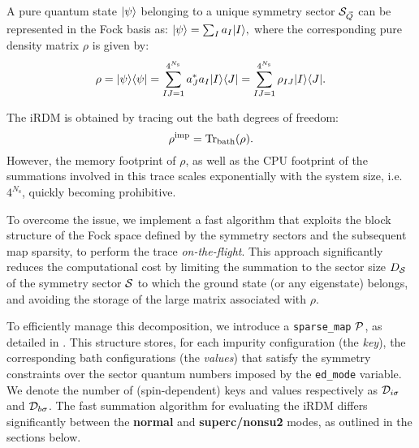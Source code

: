 \documentclass[edipack2.tex]{subfiles}
\begin{document}
A pure quantum state $|\psi\rangle$ belonging to a unique symmetry 
sector ${\cal S}_{\vec{Q}}$ can be represented in the Fock basis as:
$
|\psi\rangle = \sum_I a_I |I\rangle,
$
where the corresponding pure density matrix $\rho$ is given by:
\begin{equation}
\rho = |\psi\rangle\langle \psi| = \sum_{IJ=1}^{4^{N_\mathrm{s}}} 
a^*_J a_I |I\rangle\langle J| = \sum_{IJ=1}^{4^{N_\mathrm{s}}} 
\rho_{IJ} |I\rangle\langle J|.
\end{equation}


The iRDM is obtained by tracing out the bath degrees of freedom:
\begin{equation}
\rho^\mathrm{imp} = {\rm Tr}_\mathrm{bath}(\rho).
\end{equation}
However, the memory footprint of $\rho$, as well as the CPU footprint 
of the summations involved in this trace scales exponentially 
with the system size, i.e.~$4^{N_\mathrm{s}}$, quickly becoming prohibitive.

To overcome the issue, we implement a fast algorithm that exploits the 
block structure of the Fock space defined by the symmetry sectors and
the subsequent map sparsity, to perform the trace \emph{on-the-flight}. 
This approach significantly reduces the computational cost by limiting 
the summation to the sector size $D_{\cal S}$ of the symmetry sector 
${\cal S}$ to which the ground state (or any eigenstate) belongs, and avoiding
the storage of the large matrix associated with $\rho$.

%
%
To efficiently manage this decomposition, we introduce a 
{\tt sparse\_map} ${\cal P}$, as detailed in . 
This structure stores, for each impurity configuration 
(the \emph{key}), the 
corresponding bath configurations 
(the \emph{values}) that 
satisfy the symmetry constraints over the sector quantum numbers
imposed by the {\tt ed\_mode} variable.
We denote the number of (spin-dependent) keys and values respectively
as ${\cal D}_{i\sigma}$ and ${\cal D}_{b\sigma}$.
The fast summation algorithm for evaluating the iRDM differs 
significantly between the {\bf normal} and {\bf superc/nonsu2} modes, 
as outlined in the sections below.
\end{document}
